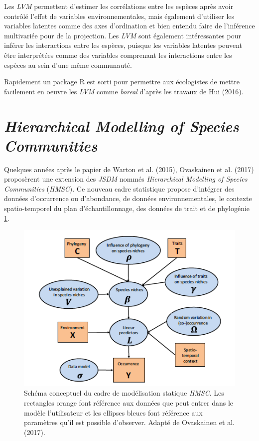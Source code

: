 \documentclass[
  12pt,
  a4paper,
  oneside]{report}
\begin{document}
Les \emph{LVM} permettent d'estimer les corrélations entre les espèces
après avoir contrôlé l'effet de variables environnementales, mais
également d'utiliser les variables latentes comme des axes d'ordination
et bien entendu faire de l'inférence multivariée pour de la projection.
Les \emph{LVM} sont également intéressantes pour inférer les
interactions entre les espèces, puisque les variables latentes peuvent
être interprétées comme des variables comprenant les interactions entre
les espèces au sein d'une même communauté.

Rapidement un package R est sorti pour permettre aux écologistes de
mettre facilement en oeuvre les \emph{LVM} comme \emph{boreal} d'après
les travaux de Hui (2016).

\hypertarget{hierarchical-modelling-of-species-communities}{%
\section{\texorpdfstring{\emph{Hierarchical Modelling of Species
Communities}}{Hierarchical Modelling of Species Communities}}\label{hierarchical-modelling-of-species-communities}}

Quelques années après le papier de Warton et al. (2015), Ovaskainen et
al. (2017) proposèrent une extension des \emph{JSDM} nommés
\emph{Hierarchical Modelling of Species Communities} (\emph{HMSC}). Ce
nouveau cadre statistique propose d'intégrer des données d'occurrence ou
d'abondance, de données environnementales, le contexte spatio-temporel
du plan d'échantillonnage, des données de trait et de phylogénie
\cref{fig:hmsc_summary}.

\begin{figure}
\hypertarget{fig:hmsc_summary}{%
\centering
\includegraphics{figures/hmsc_summary.png}
\caption{Schéma conceptuel du cadre de modélisation statique
\emph{HMSC}. Les rectangles orange font référence aux données que peut
entrer dans le modèle l'utilisateur et les ellipses bleues font
référence aux paramètres qu'il est possible d'observer. Adapté de
Ovaskainen et al. (2017).}\label{fig:hmsc_summary}
}
\end{figure}
\end{document}

